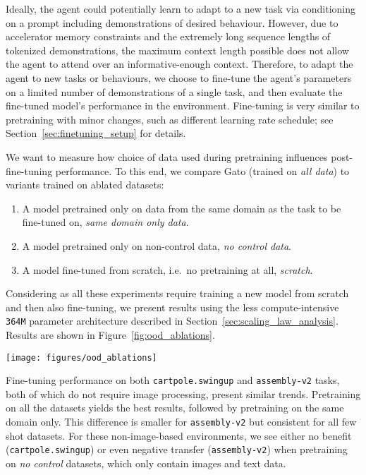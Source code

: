 \documentclass[10pt]{article} \usepackage[accepted]{tmlr}
\newcommand{\model}{{Gato}}
\begin{document}
Ideally, the agent could potentially learn to adapt to a new task via conditioning on a prompt including demonstrations of desired behaviour. 
However, due to accelerator memory constraints and the extremely long sequence lengths of tokenized demonstrations, the  maximum context length possible does not allow the agent to attend over an informative-enough context. 
Therefore, to adapt the agent to new tasks or behaviours, we choose to fine-tune the agent's parameters on a limited number of demonstrations of a single task, and then evaluate the fine-tuned model's performance in the environment.
Fine-tuning is very similar to pretraining with minor changes, such as different learning rate schedule; see Section~\ref{sec:finetuning_setup} for details.


We want to measure how choice of data used during pretraining influences post-fine-tuning performance.
To this end, we compare \model{} (trained on \textit{all data}) to variants trained on ablated datasets:
\begin{enumerate}
\item A model pretrained only on data from the same domain as the task to be fine-tuned on, \textit{same domain only data}.
\item A model pretrained only on non-control data, \textit{no control data}.
\item A model fine-tuned from scratch, i.e.\ no pretraining at all, \textit{scratch}.
\end{enumerate}

Considering as all these experiments require training a new model from scratch and then also fine-tuning, we present results using the less compute-intensive \texttt{364M} parameter architecture described in Section~\ref{sec:scaling_law_analysis}.
Results are shown in Figure~\ref{fig:ood_ablations}.
\begin{figure*}[t]
    \texttt{[image: figures/ood\_ablations]}    
    \caption{
    {\bf Few-shot performance, ablating over various pretraining settings.} Orange corresponds to the base \model{} pretrained on all data. Red is trained from scratch only on the few-shot data. \texttt{364M} parameter variants of \model{} were used for this experiment to save compute.
    \label{fig:ood_ablations}}
\end{figure*}


Fine-tuning performance on both \texttt{cartpole.swingup} and \texttt{assembly-v2} tasks, both of which do not require image processing, present similar trends.
Pretraining on all the datasets yields the best results, followed by pretraining on the same domain only. This difference is smaller for \texttt{assembly-v2} but consistent for all few shot datasets.
For these non-image-based environments, we see either no benefit (\texttt{cartpole.swingup}) or even negative transfer (\texttt{assembly-v2}) when pretraining on \textit{no control} datasets, which only contain images and text data.
\end{document}
